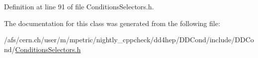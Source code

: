 Definition at line 91 of file Conditions\+Selectors.\+h.



The documentation for this class was generated from the following file\+:\begin{DoxyCompactItemize}
\item 
/afs/cern.\+ch/user/m/mpetric/nightly\+\_\+cppcheck/dd4hep/\+D\+D\+Cond/include/\+D\+D\+Cond/\hyperlink{_conditions_selectors_8h}{Conditions\+Selectors.\+h}\end{DoxyCompactItemize}
